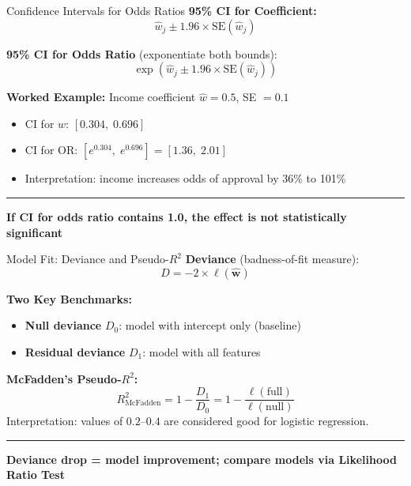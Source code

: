 \documentclass[8pt,aspectratio=169]{beamer}
\newcommand{\bottomnote}[1]{%
\vfill
\vspace{-2mm}
\textcolor{mllavender2}{\rule{\textwidth}{0.4pt}}
\vspace{1mm}
\footnotesize
\textbf{#1}
}
\begin{document}
\begin{frame}[t]{Confidence Intervals for Odds Ratios}
\textbf{95\% CI for Coefficient:}
\begin{equation}
  \hat{w}_j \pm 1.96 \times \text{SE}(\hat{w}_j)
\end{equation}

\textbf{95\% CI for Odds Ratio} (exponentiate both bounds):
\begin{equation}
  \exp\!\left(\hat{w}_j \pm 1.96 \times \text{SE}(\hat{w}_j)\right)
\end{equation}

\vspace{0.3em}
\textbf{Worked Example:} Income coefficient $\hat{w} = 0.5$, SE $= 0.1$
\begin{itemize}
  \item CI for $w$: $[0.304,\; 0.696]$
  \item CI for OR: $[e^{0.304},\; e^{0.696}] = [1.36,\; 2.01]$
  \item Interpretation: income increases odds of approval by 36\% to 101\%
\end{itemize}
\bottomnote{If CI for odds ratio contains 1.0, the effect is not statistically significant}
\end{frame}

\begin{frame}[t]{Model Fit: Deviance and Pseudo-$R^2$}
\textbf{Deviance} (badness-of-fit measure):
\begin{equation}
  D = -2 \times \ell(\hat{\mathbf{w}})
\end{equation}

\textbf{Two Key Benchmarks:}
\begin{itemize}
  \item \textbf{Null deviance} $D_0$: model with intercept only (baseline)
  \item \textbf{Residual deviance} $D_1$: model with all features
\end{itemize}

\vspace{0.3em}
\textbf{McFadden's Pseudo-$R^2$:}
\begin{equation}
  R^2_{\text{McFadden}} = 1 - \frac{D_1}{D_0} = 1 - \frac{\ell(\text{full})}{\ell(\text{null})}
\end{equation}
Interpretation: values of $0.2$--$0.4$ are considered good for logistic regression.
\bottomnote{Deviance drop = model improvement; compare models via Likelihood Ratio Test}
\end{frame}
\end{document}
